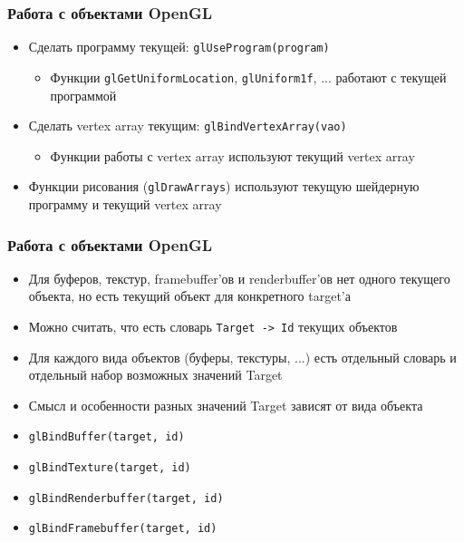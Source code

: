 \documentclass{beamer}
\begin{document}
\begin{frame}[fragile]
\frametitle{Работа с объектами OpenGL}
\begin{itemize}
\item Сделать программу текущей: \verb|glUseProgram(program)|
\begin{itemize}
\item Функции \verb|glGetUniformLocation|, \verb|glUniform1f|, ... работают с текущей программой
\end{itemize}
\pause
\item Сделать vertex array текущим: \verb|glBindVertexArray(vao)|
\begin{itemize}
\item Функции работы с vertex array используют текущий vertex array
\end{itemize}
\pause
\item Функции рисования (\verb|glDrawArrays|) используют текущую шейдерную программу и текущий vertex array
\end{itemize}
\end{frame}

\begin{frame}[fragile]
\frametitle{Работа с объектами OpenGL}
\begin{itemize}
\item Для буферов, текстур, framebuffer'ов и renderbuffer'ов нет одного текущего объекта, но есть текущий объект для конкретного target'а
\pause
\item Можно считать, что есть словарь \verb|Target -> Id| текущих объектов
\pause
\item Для каждого вида объектов (буферы, текстуры, ...) есть отдельный словарь и отдельный набор возможных значений Target
\pause
\item Смысл и особенности разных значений Target зависят от вида объекта
\pause
\item \verb|glBindBuffer(target, id)|
\item \verb|glBindTexture(target, id)|
\item \verb|glBindRenderbuffer(target, id)|
\item \verb|glBindFramebuffer(target, id)|
\end{itemize}
\end{frame}
\end{document}
